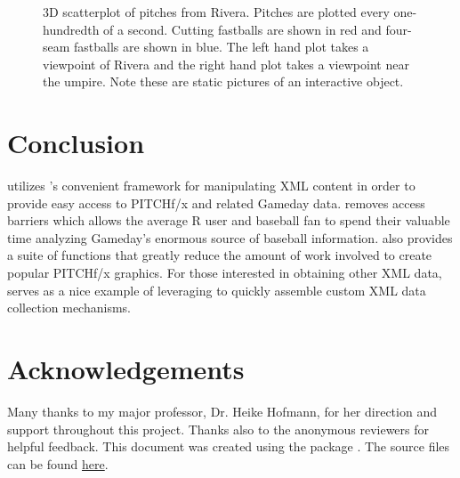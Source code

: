 \begin{article}
\begin{figure}[h]
\begin{minipage}[t]{0.45\textwidth}
\end{minipage}

\caption{3D scatterplot of pitches from Rivera. Pitches are plotted every one-hundredth
of a second. Cutting fastballs are shown in red and four-seam fastballs
are shown in blue. The left hand plot takes a viewpoint of Rivera
and the right hand plot takes a viewpoint near the umpire. Note these
are static pictures of an interactive object. \label{fig:rgl}}
\end{figure}



\section{Conclusion}

 utilizes 's convenient framework for manipulating
XML content in order to provide easy access to PITCHf/x and related
Gameday data.  removes access barriers which allows
the average R user and baseball fan to spend their valuable time analyzing
Gameday's enormous source of baseball information. 
also provides a suite of functions that greatly reduce the amount
of work involved to create popular PITCHf/x graphics. For those interested
in obtaining other XML data,  serves as a nice example
of leveraging  to quickly assemble custom XML data collection
mechanisms.

\section{Acknowledgements}

Many thanks to my major professor, Dr. Heike Hofmann, for her direction
and support throughout this project. Thanks also to the anonymous
reviewers for helpful feedback. This document was created using the
 package \citet{knitr}. The source files can be found
\href{https://github.com/cpsievert/RJournal-pitchRx}{here}.






\address{Carson Sievert\\
Department of Statistics\\
Iowa State University}\\

\end{article}
